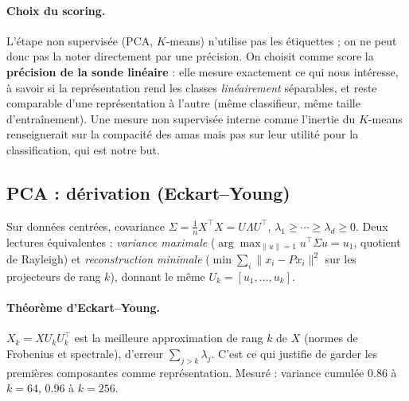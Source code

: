 \documentclass[11pt]{article}
\theoremstyle{remark}
\newcommand{\norm}[1]{\lVert #1 \rVert}
\newcommand{\T}{^{\top}}
\begin{document}
\paragraph{Choix du scoring.} L'étape non supervisée (PCA, $K$-means) n'utilise pas
les étiquettes ; on ne peut donc pas la noter directement par une précision. On
choisit comme score la \textbf{précision de la sonde linéaire} : elle mesure
exactement ce qui nous intéresse, à savoir si la représentation rend les classes
\emph{linéairement} séparables, et reste comparable d'une représentation à l'autre
(même classifieur, même taille d'entraînement). Une mesure non supervisée interne
comme l'inertie du $K$-means renseignerait sur la compacité des amas mais pas sur
leur utilité pour la classification, qui est notre but.

\subsection{PCA : dérivation (Eckart–Young)}\label{sec:pca}
Sur données centrées, covariance $\Sigma=\tfrac1n X\T X=U\Lambda U\T$,
$\lambda_1\ge\cdots\ge\lambda_d\ge0$. Deux lectures équivalentes :
\emph{variance maximale} ($\arg\max_{\norm u=1} u\T\Sigma u = u_1$, quotient de
Rayleigh) et \emph{reconstruction minimale}
($\min \sum_i\norm{x_i-Px_i}^2$ sur les projecteurs de rang $k$), donnant le même
$U_k=[u_1,\dots,u_k]$.
\paragraph{Théorème d'Eckart–Young.} $X_k=XU_kU_k\T$ est la meilleure
approximation de rang $k$ de $X$ (normes de Frobenius et spectrale), d'erreur
$\sum_{j>k}\lambda_j$. C'est ce qui justifie de garder les premières composantes
comme représentation. Mesuré : variance cumulée $0.86$ à $k{=}64$, $0.96$ à
$k{=}256$.
\end{document}
